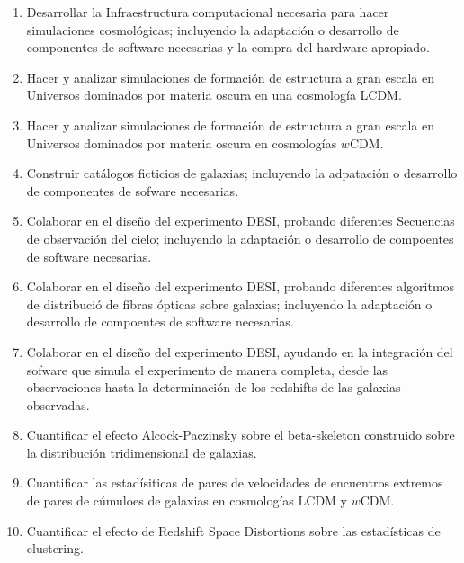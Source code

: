\begin{enumerate}
\item Desarrollar la Infraestructura computacional necesaria para hacer simulaciones cosmol\'ogicas; incluyendo la adaptaci\'on o desarrollo de componentes de software necesarias y la compra del hardware apropiado.
\item Hacer y analizar simulaciones de formaci\'on de estructura a gran escala en Universos dominados por materia oscura en una cosmolog\'ia LCDM.
\item Hacer y analizar simulaciones de formaci\'on de estructura a gran escala en Universos dominados por materia oscura en cosmolog\'ias $w$CDM.
\item Construir cat\'alogos ficticios de galaxias; incluyendo la adpataci\'on o desarrollo de componentes de sofware necesarias.
\item Colaborar en el dise\~no del experimento DESI, probando diferentes Secuencias de observaci\'on del cielo; 
incluyendo la adaptaci\'on o desarrollo de compoentes de software necesarias.
\item Colaborar en el dise\~no del experimento DESI, probando diferentes algoritmos de distribuci\'o de fibras \'opticas sobre galaxias; incluyendo la adaptaci\'on o desarrollo de compoentes de software necesarias.
\item Colaborar en el dise\~no del experimento DESI, ayudando en la integraci\'on del sofware que simula el experimento de manera completa, desde las observaciones hasta la determinaci\'on de los redshifts de las galaxias observadas.
\item Cuantificar el efecto Alcock-Paczinsky sobre el beta-skeleton construido sobre la distribuci\'on tridimensional de galaxias.
\item Cuantificar las estad\'isiticas de pares de velocidades de encuentros extremos de pares de c\'umuloes de galaxias en cosmolog\'ias LCDM y $w$CDM.
\item Cuantificar el efecto de Redshift Space Distortions sobre las estad\'isticas de clustering. 
\end{enumerate}


